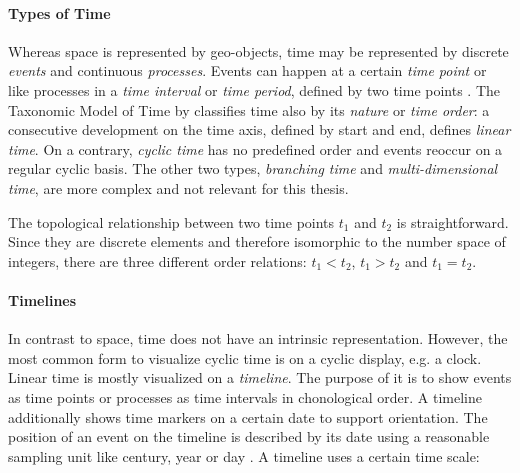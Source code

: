 \paragraph{Types of Time} %
\label{par:types_of_time}

Whereas space is represented by geo-objects, time may be represented by discrete \emph{events} and continuous \emph{processes}. Events can happen at a certain \emph{time point} or like processes in a \emph{time interval} or \emph{time period}, defined by two time points
\cite[chapter 2, pp. 47-49]{solana2014spatio}.
The Taxonomic Model of Time by
\cite{frank98typesoftime}
classifies time also by its \emph{nature} or \emph{time order}: a consecutive development on the time axis, defined by start and end, defines \emph{linear time}. On a contrary, \emph{cyclic time} has no predefined order and events reoccur on a regular cyclic basis. The other two types, \emph{branching time} and \emph{multi-dimensional time}, are more complex and not relevant for this thesis.

The topological relationship between two time points $t_1$ and $t_2$ is straightforward. Since they are discrete elements and therefore isomorphic to the number space of integers, there are three different order relations: $t_1 < t_2$, $t_1 > t_2$ and $t_1 = t_2$.


\paragraph{Timelines} %
\label{sub:timelines}

In contrast to space, time does not have an intrinsic representation. However, the most common form to visualize cyclic time is on a cyclic display, e.g. a  clock. Linear time is mostly visualized on a \emph{timeline}. The purpose of it is to show events as time points or processes as time intervals in chonological order. A timeline additionally shows time markers on a certain date to support orientation. The position of an event on the timeline is described by its date using a reasonable sampling unit like century, year or day
\cite[p. 32]{Langran1989timeingis}.
A timeline uses a certain time scale:

